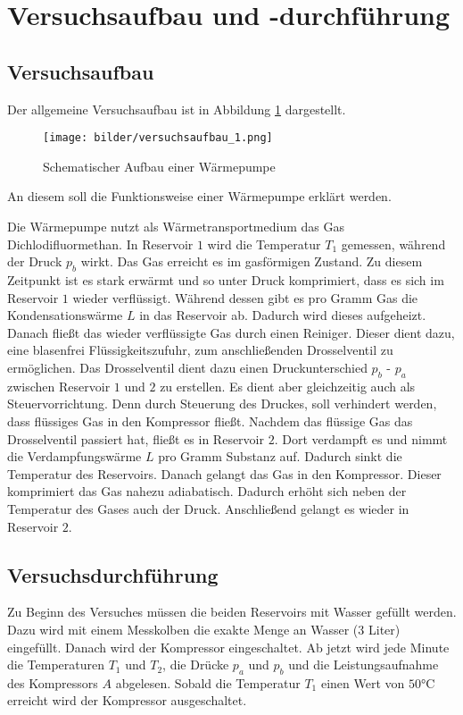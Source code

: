 \section{Versuchsaufbau und -durchführung}

\subsection{Versuchsaufbau}

Der allgemeine Versuchsaufbau ist in Abbildung \ref{fig:aufbau_warmepumpe} dargestellt.


\begin{figure}
\centering
\texttt{[image: bilder/versuchsaufbau\_1.png]}
\caption{Schematischer Aufbau einer Wärmepumpe}
\label{fig:aufbau_warmepumpe}
\end{figure}


An diesem soll die Funktionsweise einer Wärmepumpe erklärt werden.

Die Wärmepumpe nutzt als Wärmetransportmedium das Gas Dichlodifluormethan.
In Reservoir $1$ wird die Temperatur $T_1$ gemessen, während der Druck $p_b$ wirkt.
Das Gas erreicht es im gasförmigen Zustand. Zu diesem Zeitpunkt ist es
stark erwärmt und so unter Druck komprimiert, dass es sich im Reservoir $1$ wieder verflüssigt.
Während dessen gibt es pro Gramm Gas die Kondensationswärme $L$ in das Reservoir ab.
Dadurch wird dieses aufgeheizt.
Danach fließt das wieder verflüssigte Gas durch einen Reiniger. 
Dieser dient dazu, eine blasenfrei Flüssigkeitszufuhr, zum anschließenden 
Drosselventil zu ermöglichen. 
Das Drosselventil dient dazu einen Druckunterschied 
$p_b$ - $p_a$ zwischen Reservoir $1$ und $2$ zu erstellen.
Es dient aber gleichzeitig auch als Steuervorrichtung.
Denn durch Steuerung des Druckes, soll verhindert werden,
dass flüssiges Gas in den Kompressor fließt.
Nachdem das flüssige Gas das Drosselventil passiert hat,
fließt es in Reservoir $2$. Dort verdampft es und nimmt die Verdampfungswärme 
$L$ pro Gramm Substanz auf. Dadurch sinkt die Temperatur des Reservoirs.
Danach gelangt das Gas in den Kompressor. Dieser komprimiert das Gas nahezu adiabatisch.
Dadurch erhöht sich neben der Temperatur des Gases auch der Druck.
Anschließend gelangt es wieder in Reservoir $2$.


\subsection{Versuchsdurchführung}
Zu Beginn des Versuches müssen die beiden Reservoirs mit Wasser gefüllt werden.
Dazu wird mit einem Messkolben die exakte Menge an Wasser ($3$ Liter) eingefüllt.
Danach wird der Kompressor eingeschaltet. 
Ab jetzt wird jede Minute die Temperaturen $T_1$ und $T_2$, die Drücke $p_a$ und $p_b$ 
und die Leistungsaufnahme des Kompressors $A$ abgelesen.
Sobald die Temperatur $T_1$ einen Wert von $50\si{\degreeCelsius}$ erreicht
wird der Kompressor ausgeschaltet.

